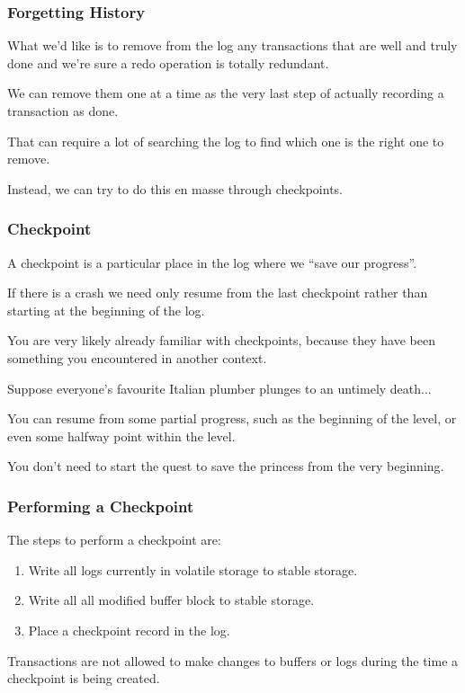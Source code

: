 \begin{frame}
\frametitle{Forgetting History}
What we'd like is to remove from the log any transactions that are well and truly done and we're sure a redo operation is totally redundant. 

We can remove them one at a time as the very last step of actually recording a transaction as done. 

That can require a lot of searching the log to find which one is the right one to remove. 

Instead, we can try to do this en masse through \alert{checkpoints}.


\end{frame}


\begin{frame}
\frametitle{Checkpoint}

A checkpoint is a particular place in the log where we ``save our progress''. 

If there is a crash we need only resume from the last checkpoint rather than starting at the beginning of the log. 

You are very likely already familiar with checkpoints, because they have been something you encountered in another context. 

Suppose everyone's favourite Italian plumber plunges to an untimely death... 

You can resume from some partial progress, such as the beginning of the level, or even some halfway point within the level.

You don't need to start the quest to save the princess from the very beginning.


\end{frame}

\begin{frame}
\frametitle{Performing a Checkpoint}

The steps to perform a checkpoint are:

\begin{enumerate}
	\item Write all logs currently in volatile storage to stable storage.
	\item Write all all modified buffer block to stable storage.
	\item Place a checkpoint record in the log.
\end{enumerate}

Transactions are not allowed to make changes to buffers or logs during the time a checkpoint is being created.

\end{frame}

